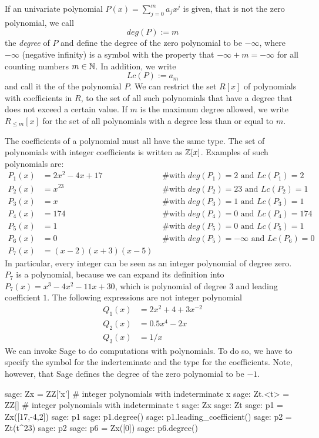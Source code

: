 If an univariate polynomial $P(x)=\sum_{j=0}^m a_jx^j$ is given, that is not the zero polynomial, we call 
\begin{equation}
deg(P):=m
\end{equation}
the \textit{degree} of $P$ and define the degree of the zero polynomial to be $-\infty$, where $-\infty$ (negative infinity) is a symbol with the property that $-\infty + m = -\infty$ for all counting numbers $m\in\mathbb{N}$. In addition, we write 
\begin{equation}
\label{def_leading_coefficient}
Lc(P):=a_m
\end{equation}
and call it the  of the polynomial $P$. We can restrict the set $R[x]$ of  polynomials with coefficients in $R$, to the set of all such polynomials that have a degree that does not exceed a certain value. If $m$ is the maximum degree allowed, we write $R_{\leq m}[x]$ for the set of all polynomials with a degree less than or equal to $m$.
\begin{example} The coefficients of a polynomial must all have the same type. The set of polynomials with integer coefficients is written as $\mathbb{Z}[x]$. Examples of such polynomials are:
\begin{align*}
P_1(x) &= 2x^2 -4x +17 & \text{ \# with } deg(P_1)=2 \text{ and } Lc(P_1)=2\\
P_2(x) &= x^{23} & \text{ \# with } deg(P_2)=23 \text{ and } Lc(P_2)=1\\
P_3(x) &= x & \text{ \# with }  deg(P_3)=1 \text{ and } Lc(P_3)=1\\
P_4(x) &= 174 & \text{ \# with }  deg(P_4)=0 \text{ and } Lc(P_4)=174\\
P_5(x) &= 1 & \text{ \# with }  deg(P_5)=0 \text{ and } Lc(P_5)=1\\
P_6(x) &= 0 & \text{ \# with }  deg(P_5)=-\infty \text{ and } Lc(P_6)=0\\
P_7(x) &= (x-2)(x+3)(x-5)
\end{align*}
In particular, every integer can be seen as an integer polynomial of degree zero. $P_7$ is a polynomial, because we can expand its definition into $P_7(x)=x^3 - 4 x^2 - 11 x + 30$, which is polynomial of degree $3$ and leading coefficient $1$. The following expressions are not integer polynomial
\begin{align*}
Q_1(x) &= 2x^2 + 4 + 3x^{-2}\\
Q_2(x) &= 0.5x^4 -2x\\
Q_3(x) &=1/x
\end{align*}
We can invoke Sage to do computations with polynomials. To do so, we have to specify the symbol for the inderteminate and the type for the coefficients. Note, however, that Sage defines the degree of the zero polynomial to be $-1$.
\begin{sagecommandline}
sage: Zx = ZZ['x'] # integer polynomials with indeterminate x
sage: Zt.<t> = ZZ[] # integer polynomials with indeterminate t
sage: Zx
sage: Zt
sage: p1 = Zx([17,-4,2])
sage: p1
sage: p1.degree()
sage: p1.leading_coefficient()
sage: p2 = Zt(t^23)
sage: p2
sage: p6 = Zx([0])
sage: p6.degree()
\end{sagecommandline}
\end{example}
